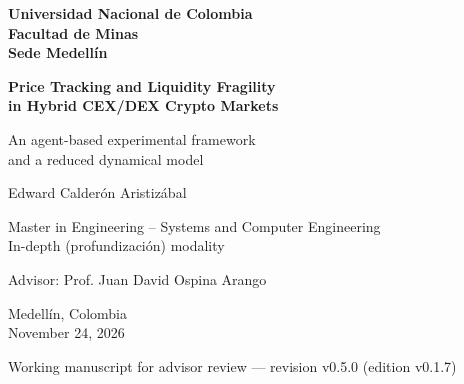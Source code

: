 \documentclass[11pt,letterpaper]{report}
\newcommand{\versionTesis}{v0.1.7}
\newcommand{\revisionManuscrito}{v0.5.0}
\numberwithin{equation}{chapter}
\begin{document}
\begin{titlepage}
  \thispagestyle{empty}
  \centering
  \singlespacing
  {\large\bfseries Universidad Nacional de Colombia\\[2pt]
  Facultad de Minas\\[2pt]
  Sede Medellín\par}
  \vspace{3.2cm}
  {\LARGE\bfseries Price Tracking and Liquidity Fragility\\
  in Hybrid CEX/DEX Crypto Markets\par}
  \vspace{0.9cm}
  {\Large An agent-based experimental framework\\
  and a reduced dynamical model\par}
  \vspace{2.6cm}
  {\Large Edward Calderón Aristizábal\par}
  \vspace{1.6cm}
  {\large Master in Engineering -- Systems and Computer Engineering\\[2pt]
  In-depth (profundización) modality\par}
  \vspace{0.8cm}
  {\large Advisor: Prof. Juan David Ospina Arango\par}
  \vfill
  {\large Medellín, Colombia\\[2pt]
  November 24, 2026\par}
  \vspace{0.3cm}
  {\small Working manuscript for advisor review --- revision \revisionManuscrito{} (edition \versionTesis{})\par}
\end{titlepage}

\setcounter{page}{1}

\begingroup
\setcounter{secnumdepth}{-1}
\titleformat{\section}{\Large\bfseries}{}{0pt}{}
\singlespacing

\clearpage

\endgroup
\setcounter{secnumdepth}{2}
\end{document}
